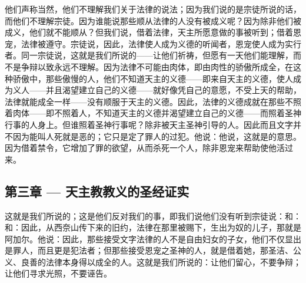 他们声称当然，他们不理解我们关于法律的说法；因为我们说的是宗徒所说的话，而他们不理解宗徒。因为谁能说那些顺从法律的人没有被成义呢？因为除非他们被成义，他们就不能顺从？但我们说，借着法律，天主所愿意做的事被听到；借着恩宠，法律被遵守。宗徒说，因此，法律使人成为义德的听闻者，恩宠使人成为实行者。同一宗徒说，这就是我们所说的——让他们祈祷，但愿有一天他们能理解，而不是争辩以致永远不理解。因为法律不可能由肉体，即由肉性的骄傲所成全，在这种骄傲中，那些傲慢的人，他们不知道天主的义德——即来自天主的义德，使人成为义人——并且渴望建立自己的义德——就好像凭自己的意愿，不受上天的帮助，法律就能成全一样——没有顺服于天主的义德。因此，法律的义德成就在那些不照着肉体——即不照着人，不知道天主的义德并渴望建立自己的义德——而照着圣神行事的人身上。但谁照着圣神行事呢？除非被天主圣神引导的人。因此而且文字并不因为能叫人死就是恶的；它只是定了罪人的过犯。他说：他说，这就是的意思。因为借着禁令，它增加了罪的欲望，从而杀死一个人，除非恩宠来帮助使他活过来。\par


\subsection{第三章 — 天主教教义的圣经证实}

这就是我们所说的；这是他们反对我们的事，即我们说他们没有听到宗徒说：和：和：因此，从西奈山传下来的旧约，法律在那里被赐下，生出为奴的儿子，那就是阿加尔。他说：因此，那些接受文字法律的人不是自由妇女的子女，他们不仅显出是罪人，而且更是犯法者；但那些接受恩宠之圣神的人，就是借着她，那圣洁、公义、良善的法律本身得以成全的人。这就是我们所说的：让他们留心，不要争辩；让他们寻求光照，不要诬告。\par

